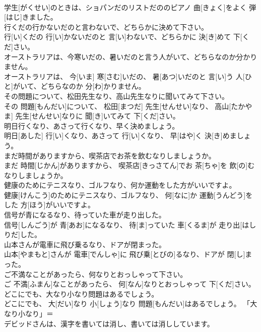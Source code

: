 \documentclass[8pt]{extreport}
\begin{document}
\begin{CJK}{UTF8}{min}
\\	学生[がくせい]のときは、ショパンだのリストだののピアノ 曲[きょく]をよく 弾[はじ]きました。	
\\	行くだの行かないだのと言わないで、どちらかに決めて下さい。	
\\	行[い]くだの 行[い]かないだのと 言[い]わないで、どちらかに 決[き]めて 下[くだ]さい。	
\\	オーストラリアは、今寒いだの、暑いだのと言う人がいて、どちらなのか分かりません。	
\\	オーストラリアは、 今[いま] 寒[さむ]いだの、 暑[あつ]いだのと 言[い]う 人[ひと]がいて、どちらなのか 分[わ]かりません。	
\\	その問題について、松田先生なり、高山先生なりに聞いてみて下さい。	
\\	その 問題[もんだい]について、 松田[まつだ] 先生[せんせい]なり、 高山[たかやま] 先生[せんせい]なりに 聞[き]いてみて 下[くだ]さい。	
\\	明日行くなり、あさって行くなり、早く決めましょう。	
\\	明日[あした] 行[い]くなり、あさって 行[い]くなり、 早[はや]く 決[き]めましょう。	
\\	まだ時間がありますから、喫茶店でお茶を飲むなりしましょうか。	
\\	まだ 時間[じかん]がありますから、 喫茶店[きっさてん]でお 茶[ちゃ]を 飲[の]むなりしましょうか。	
\\	健康のためにテニスなり、ゴルフなり、何か運動をした方がいいですよ。	
\\	健康[けんこう]のためにテニスなり、ゴルフなり、 何[なに]か 運動[うんどう]をした 方[ほう]がいいですよ。	
\\	信号が青になるなり、待っていた車が走り出した。	
\\	信号[しんごう]が 青[あお]になるなり、 待[ま]っていた 車[くるま]が 走り出[はしりだ]した。	
\\	山本さんが電車に飛び乗るなり、ドアが閉まった。	
\\	山本[やまもと]さんが 電車[でんしゃ]に 飛び乗[とびの]るなり、ドアが 閉[し]まった。	
\\	ご不満なことがあったら、何なりとおっしゃって下さい。	
\\	ご 不満[ふまん]なことがあったら、 何[なん]なりとおっしゃって 下[くだ]さい。	
\\	どこにでも、大なり小なり問題はあるでしょう。	
\\	どこにでも、 大[だい]なり 小[しょう]なり 問題[もんだい]はあるでしょう。	「大なり小なり」＝ 
\\	デビッドさんは、漢字を書いては消し、書いては消ししています。	

\end{CJK}
\end{document}

